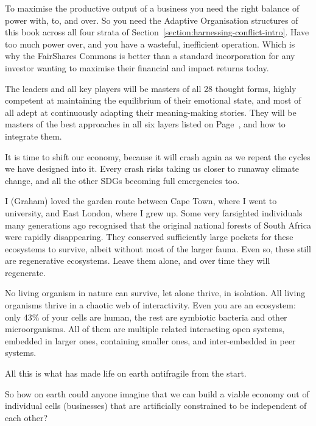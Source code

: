 To maximise the productive output of a business you need the right balance of power with, to, and over. So you need the Adaptive Organisation structures of this book across all four strata of Section~\ref{section:harnessing-conflict-intro}. Have too much power over, and you have a wasteful, inefficient operation. Which is why the FairShares Commons  is better than a standard incorporation for any investor wanting to maximise their financial and impact returns today. 


The leaders and all key players will be masters of all 28 thought forms, highly competent at maintaining the equilibrium of their emotional state, and most of all adept at continuously adapting their meaning\hyp{}making stories. They will be masters of the best approaches in all six layers listed on Page~\pageref{list:six-layers}, and how to integrate them. 


It is time to shift our economy\cite{dekemmeter-shifting-economy}, because it will crash again\cite{guardian-groundhog-day} as we repeat the cycles we have designed into it. Every crash risks taking us closer to runaway climate change, and all the other SDGs  becoming full emergencies too.


\begin{longstoryblock}
I (Graham) loved the garden route between Cape Town, where I went to university, and East London, where I grew up.  Some very farsighted individuals many generations ago recognised that the original national forests of South Africa were rapidly disappearing. They conserved sufficiently large pockets for these ecosystems to survive, albeit without most of the larger fauna. Even so, these still are regenerative ecosystems. Leave them alone, and over time they will regenerate.
\end{longstoryblock}


No living organism in nature can survive, let alone thrive, in isolation. All living organisms thrive in a chaotic web of interactivity. Even you are an ecosystem: only 43\% of your cells are human, the rest are symbiotic bacteria and other microorganisms. All of them are multiple related interacting open systems, embedded in larger ones, containing smaller ones, and inter-embedded in peer systems. 


All this is what has made life on earth antifragile from the start.


So how on earth could anyone imagine that we can build a viable economy out of individual cells (businesses) that are artificially constrained to be independent of each other? 


